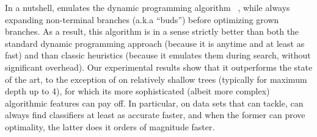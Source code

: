 \documentclass{llncs}
\begin{document}
In a nutshell, \budalg emulates the dynamic programming algorithm \dleight~\cite{dl8}, while always expanding non-terminal branches (a.k.a ``buds'') before optimizing grown branches. As a result, this algorithm is in a sense strictly better than both the standard dynamic programming approach (because it is anytime and at least as fast) and than classic heuristics (because it emulates them during search, without significant overhead).
Our experimental results show that it outperforms the state of the art, to the exception of \murtree on relatively shallow trees (typically for maximum depth up to 4), for which its more sophisticated (albeit more complex) algorithmic features can pay off.
In particular, on data sets that \dleight can tackle, \budalg can always find classifiers at least as accurate faster, and when the former can prove optimality, the latter does it orders of magnitude faster.
\end{document}
